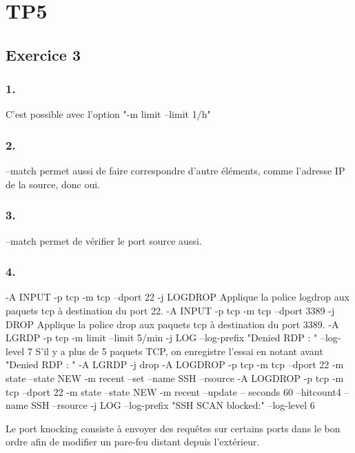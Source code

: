\chapter{TP5}
    \section{Exercice 3}
        \subsection{1.}
            C'est possible avec l'option "-m limit --limit 1/h"
        \subsection{2.}
            --match permet aussi de faire correspondre d'autre éléments, comme l'adresse IP de la source, donc oui.
        \subsection{3.}
            --match permet de vérifier le port source aussi.
        \subsection{4.}
            -A INPUT -p tcp -m tcp --dport 22 -j LOGDROP
            Applique la police logdrop aux paquets tcp à destination du port 22.
            -A INPUT -p tcp -m tcp --dport 3389 -j DROP
            Applique la police drop aux paquets tcp à destination du port 3389.
            -A LGRDP -p tcp -m limit --limit 5/min -j LOG --log-prefix "Denied RDP : " --log-level 7
            S'il y a plus de 5 paquets TCP, on enregistre l'essai en notant avant "Denied RDP : "
            -A LGRDP -j drop
            -A LOGDROP -p tcp -m tcp --dport 22 -m state --state NEW -m recent --set --name SSH --rsource
            -A LOGDROP -p tcp -m tcp --dport 22 -m state --state NEW -m recent --update -- seconds 60 --hitcount4 --name SSH --rsource -j LOG --log-prefix "SSH SCAN blocked:" --log-level 6

            Le port knocking consiste à envoyer des requêtes sur certains ports dans le bon ordre afin de modifier un pare-feu distant depuis l'extérieur.
